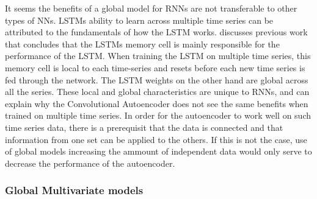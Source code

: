 It seems the benefits of a global model for RNNs are not transferable to other types
of NNs. LSTMs ability to learn across multiple time series can be attributed to the fundamentals
of how the LSTM works. \cite{Zhao2019} discusses previous work that concludes that
the LSTMs memory cell is mainly responsible for the performance of the LSTM.
When training the LSTM on multiple time series, this memory cell is local to each
time-series and resets before each new time series is fed through the network.
The LSTM weights on the other hand are global across all the series.
These local and global characteristics are unique to RNNs, and can explain
why the Convolutional Autoencoder does not see the same benefits when trained on multiple
time series.
In order for the autoencoder to work well on such time series data,
there is a prerequisit that the data is connected and that information from one set can be applied to the others.
If this is not the case, use of global models increasing the ammount of independent data would only serve to decrease the performance of the autoencoder.








\subsubsection{Global Multivariate models}


